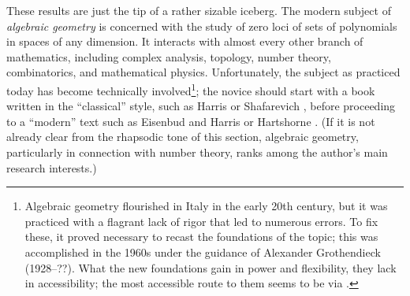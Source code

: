 \documentclass[12pt]{book}
\numberwithin{exc}{section}
\numberwithin{figure}{section}
\numberwithin{equation}{theorem}
\begin{document}
These results are just the tip of a rather 
sizable iceberg. The modern subject of \emph{algebraic geometry} is 
concerned with the study of zero loci of sets of polynomials in 
spaces of any dimension. It interacts with almost every other branch 
of mathematics, including complex analysis, topology, number theory, 
combinatorics, and mathematical physics. Unfortunately, the subject 
as practiced today has become technically involved\footnote{Algebraic
geometry flourished in Italy in the early 20th century, but it was practiced
with a flagrant lack of rigor that led to numerous errors. To fix these,
it proved necessary to recast the foundations of the topic; this was
accomplished in the 1960s
under the guidance of Alexander Grothendieck (1928--??).
What
the new foundations gain in power and flexibility, they lack in accessibility;
the most accessible route to them seems to be via \cite{bib:eh}.};
the novice should 
start with a book written in the ``classical'' style, such as 
Harris \cite{bib:har} or Shafarevich \cite{bib:sha}, before proceeding 
to a ``modern'' text such as Eisenbud and Harris
\cite{bib:eh} or Hartshorne \cite{bib:hart}.
(If it is not already clear from the 
rhapsodic tone of this section,
algebraic geometry, particularly in connection with number theory, 
ranks among the author's main research interests.)
\end{document}

